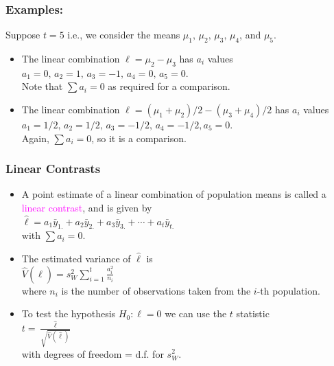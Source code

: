 \documentclass[xcolor=dvipsnames,12pt]{beamer}
\begin{document}
\begin{frame}
\frametitle{Examples:} 
Suppose $t=5$ i.e., we consider the means 
$\mu_1,\, \mu_2,\, \mu_3,\, \mu_4$, and $\mu_5$.\\[.15in]
\begin{itemize}
\item {The linear combination $\ell = \mu_2 - \mu_3$ 
has $a_i$ values\\[.2in]
 \hspace*{.7in}     $a_1 = 0,\, a_2 = 1,\, a_3 = -1,\, a_4 = 0,\, a_5 = 0.$\\[.25in]  
      Note that $\sum a_i = 0$ as required for a comparison.}\\[.25in]
\item{ The linear combination  $\ell = (\mu_1 + \mu_2)/2 - (\mu_3 + \mu_4)/2$
    has $a_i$ values\\[.18in]
\hspace*{.4in}$ a_1 = 1/2,\, a_2 = 1/2,\, a_3 = -1/2,\, a_4 = - 1/2,a_5 = 0.$\\[.25in]
Again, $\sum a_i = 0$, so it is a comparison.}
\end{itemize}
\end{frame}


\begin{frame}
\frametitle{Linear Contrasts}
\begin{itemize}
\item {A point estimate of a linear combination of population means is called a   {\textcolor{magenta}{linear contrast}}, and is given by\\[.05in]
\hspace*{1in}$\hat{\ell} = a_1 \bar{y}_{1.} + a_2 \bar{y}_{2.} + a_3\bar{y}_{3.} + \cdots + a_t \bar{y}_{t.}$\\[.05in]
 with $\sum a_i = 0$.}\\[.1in] 
\item {The estimated variance of $\hat{\ell}$ is\\[.05in]
\hspace*{1in}$\hat{V}(\hat{\ell}) = s_W^2 \sum_{i=1}^t \frac{a_i^2}{n_i}$\\[.05in]
 where $n_i$ is the number of observations taken from the $i$-th
population.} \\[.1in] 
\item {To test the hypothesis $H_0: \ell = 0$ we can use the $t$ statistic\\[.05in]
\hspace*{1in}$ t = \frac{\hat{\ell}}{\sqrt{\hat{V}(\hat{\ell})}}$\\[.05in]
 with degrees of freedom = d.f. for $s_W^2$}.
 \end{itemize}
\end{frame}
\end{document}
